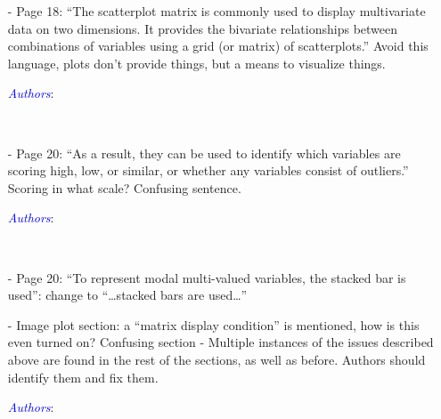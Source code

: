 \documentclass[11pt]{article}
\newcommand{\authors}[1]{

 \parbox{15cm}{\textcolor{blue}{\it Authors}: \color{red}#1}
 \\ \vspace{0.3cm}
}
\begin{document}
\begin{itemize}
{}


\item[-] Page 18: “The scatterplot matrix is commonly used to display multivariate data on two dimensions. It provides the bivariate relationships between combinations of variables using a grid (or matrix) of scatterplots.” Avoid this language, plots don’t provide things, but a means to visualize things. 
\authors{

}


\item[-] Page 20: “As a result, they can be used to identify which variables are scoring high, low, or similar, or whether any variables consist of outliers.” Scoring in what scale? Confusing sentence. 
\authors{

}


\item[-] Page 20: “To represent modal multi-valued variables, the stacked bar is used”: change to “…stacked bars are used…” 


\item[-] Image plot section: a “matrix display condition” is mentioned, how is this even turned on? Confusing section - Multiple instances of the issues described above are found in the rest of the sections, as well as before. Authors should identify them and fix them. 
\authors{

}
\end{itemize}




\end{document}

